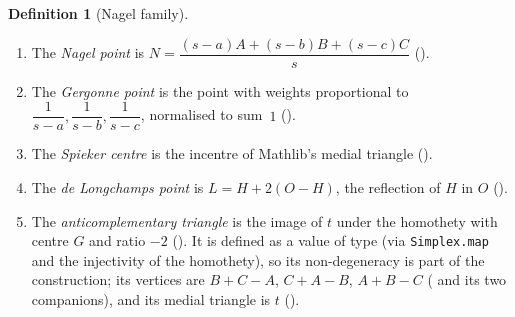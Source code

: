 \documentclass[11pt]{article}
\theoremstyle{definition}
\newtheorem{definition}{Definition}
\theoremstyle{remark}
\newcommand{\lean}[1]{\texttt{#1}}
\begin{document}
\begin{definition}[Nagel family]\label{def:nagel}
\begin{enumerate}
\item The \emph{Nagel point} is $N=\dfrac{(s-a)A+(s-b)B+(s-c)C}{s}$
().
\item The \emph{Gergonne point} is the point with weights proportional to
$\dfrac1{s-a},\dfrac1{s-b},\dfrac1{s-c}$, normalised to sum~$1$
().
\item The \emph{Spieker centre} is the incentre of Mathlib's medial triangle
 ().
\item The \emph{de Longchamps point} is $L=H+2(O-H)$, the reflection of $H$ in $O$
().
\item The \emph{anticomplementary triangle} is the image of $t$ under the homothety with centre $G$
and ratio $-2$ (). It is defined as a value of type
 (via \lean{Simplex.map} and the injectivity of the homothety), so its
non-degeneracy is part of the construction; its vertices are $B+C-A$, $C+A-B$, $A+B-C$
( and its two companions), and its medial
triangle is $t$ ().
\end{enumerate}
\end{definition}
\end{document}
